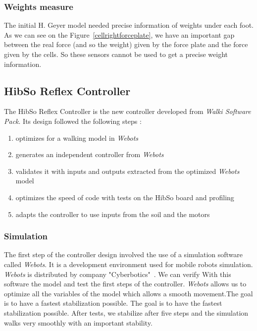 \documentclass[a4paper,12pt]{article}
\begin{document}
\subsubsection{Weights measure}
\label{soilintegration}
The initial H. Geyer model needed precise information of weights under each foot. As we can see on the Figure~\ref{cellrightforceplate}, we have an important gap between the real force (and so the weight) given by the force plate and the force given by the cells. So these sensors cannot be used to get a precise weight information.

\subsection{HibSo Reflex Controller}

The HibSo Reflex Controller is the new controller developed from \textit{Walki Software Pack}. Its design followed the following steps : 
\begin{enumerate}
	\item optimizes for a walking model in \textit{Webots}
    \item generates an independent controller from \textit{Webots}
    \item validates it with inputs and outputs extracted from the optimized \textit{Webots} model
    \item optimizes the speed of code with tests on the HibSo board and profiling
    \item adapts the controller to use inputs from the soil and the motors
\end{enumerate}

\subsubsection{Simulation}
\label{simulation}

The first step of the controller design involved the use of a simulation software called \textit{Webots}. It is a development environment used for mobile robots simulation. \textit{Webots} is distributed by company "Cyberbotics"~\cite{webots}. We can verify With this software the model and test the first steps of the controller.
\medbreak
\textit{Webots} allows us to optimize all the variables of the model which allows a smooth movement.The goal is to have a fastest stabilization possible.
\medbreak
The goal is to have the fastest stabilization possible. After tests, we stabilize after five steps and the simulation walks very smoothly with an important stability.
\end{document}
